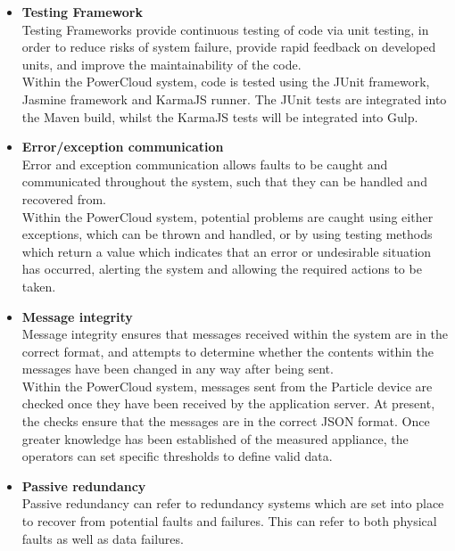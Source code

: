 \documentclass{article}
\begin{document}
	\begin{itemize}
		\item \textbf{Testing Framework}\\
		Testing Frameworks provide continuous testing of code via unit testing, 
		in order to reduce risks of system failure, provide rapid feedback on 
		developed units, and improve the maintainability of the code.\\
		
		Within the PowerCloud system, code is tested using the JUnit 
		framework, Jasmine framework and KarmaJS runner. The JUnit tests 
		are integrated into the Maven build, whilst the KarmaJS tests 
		will be integrated into Gulp.
		
		\item \textbf{Error/exception communication}\\
		Error and exception communication allows faults to be caught and 
		communicated throughout the system, such that they can be handled and 
		recovered from.\\
		
		Within the PowerCloud system, potential problems are caught using 
		either exceptions, which can be thrown and handled, or by using testing 
		methods which return a value which indicates that an error or 
		undesirable situation has occurred, alerting the system and allowing 
		the required actions to be taken.
		
		\item \textbf{Message integrity}\\
		Message integrity ensures that messages received within the system are 
		in the correct format, and attempts to determine whether the contents 
		within the messages have been changed in any way after being sent.\\
		
		Within the PowerCloud system, messages sent from the Particle device 
		are checked once they have been received by the application server. At 
		present, the checks ensure that the messages are in the correct JSON 
		format. Once greater knowledge has been established of the measured 
		appliance, the operators can set specific thresholds to define valid 
		data.
		
		\item \textbf{Passive redundancy}\\
		Passive redundancy can refer to redundancy systems which are set into 
		place to recover from potential faults and failures. This can refer to 
		both physical faults as well as data failures.\\
		

\end{itemize}
\end{document}
